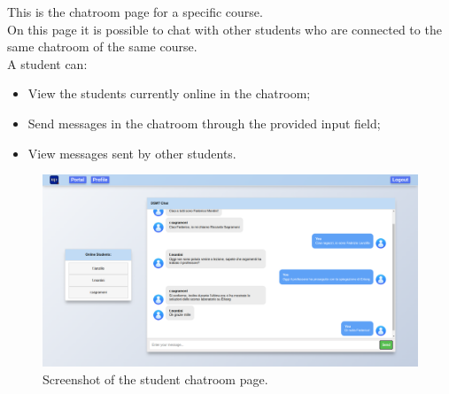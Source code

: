 This is the chatroom page for a specific course.\\
On this page it is possible to chat with other students who are connected to the same chatroom of the same course.\\
A student can:
\begin{itemize}
    \item View the students currently online in the chatroom;
    \item Send messages in the chatroom through the provided input field;
    \item View messages sent by other students.
\end{itemize}

\begin{figure}[H]
    \centering
     \includegraphics[width=1\textwidth]{img/user_manual/student/chatroom.png}
    \caption{\label{fig:student-chatroom} Screenshot of the student chatroom page.}
\end{figure}